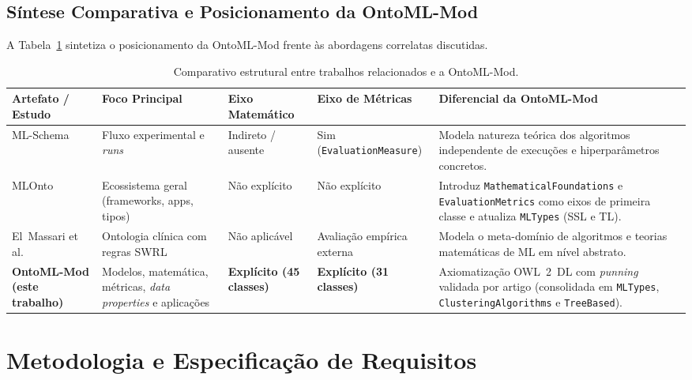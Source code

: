 \documentclass[11pt,a4paper]{article}
\newcommand{\onto}[1]{\texttt{#1}}
\begin{document}
\subsection{Síntese Comparativa e Posicionamento da OntoML-Mod}

A Tabela~\ref{tab:relacionados} sintetiza o posicionamento da OntoML-Mod frente às abordagens correlatas discutidas.

\begin{table}[htbp]
\centering
\caption{Comparativo estrutural entre trabalhos relacionados e a OntoML-Mod.}
\label{tab:relacionados}
\footnotesize
\begin{tabularx}{\textwidth}{@{}p{2.7cm}p{2.3cm}p{1.8cm}p{2.1cm}>{\raggedright\arraybackslash}X@{}}
\toprule
\textbf{Artefato / Estudo} & \textbf{Foco Principal} & \textbf{Eixo Matemático} & \textbf{Eixo de Métricas} & \textbf{Diferencial da OntoML-Mod} \\
\midrule
ML-Schema~\cite{publio2018mlschema} & Fluxo experimental e \emph{runs} & Indireto / ausente & Sim (\onto{EvaluationMeasure}) & Modela natureza teórica dos algoritmos independente de execuções e hiperparâmetros concretos. \\
MLOnto~\cite{braga2020mlonto} & Ecossistema geral (frameworks, apps, tipos) & Não explícito & Não explícito & Introduz \onto{MathematicalFoundations} e \onto{EvaluationMetrics} como eixos de primeira classe e atualiza \onto{MLTypes} (SSL e TL). \\
El~Massari et al.~\cite{elmassari2022diabetes} & Ontologia clínica com regras SWRL & Não aplicável & Avaliação empírica externa & Modela o meta-domínio de algoritmos e teorias matemáticas de ML em nível abstrato. \\
\textbf{OntoML-Mod (este trabalho)} & Modelos, matemática, métricas, \emph{data properties} e aplicações & \textbf{Explícito (45 classes)} & \textbf{Explícito (31 classes)} & Axiomatização OWL~2~DL com \emph{punning} validada por artigo (consolidada em \onto{MLTypes}, \onto{ClusteringAlgorithms} e \onto{TreeBased}). \\
\bottomrule
\end{tabularx}
\end{table}

\section{Metodologia e Especificação de Requisitos}\label{sec:met}
\end{document}
